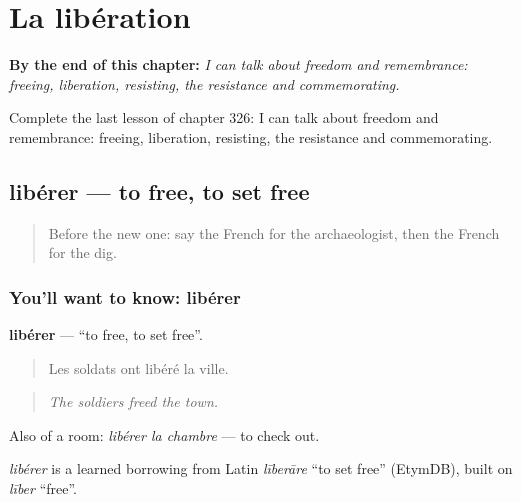 
\chapter{La libération}
\label{ch:fr-la-liberation}

\begin{chapteropening}
\textbf{By the end of this chapter:} \emph{I can talk about freedom and remembrance: freeing, liberation, resisting, the resistance and commemorating.}

Complete the last lesson of chapter 326: I can talk about freedom and remembrance: freeing, liberation, resisting, the resistance and commemorating.
\end{chapteropening}

\section[libérer]{libérer — to free, to set free}

\label{lesson:FR-C326-liberer}



\begin{quote}
Before the new one: say the French for the archaeologist, then the French for the dig.
\end{quote}

\subsection*{You'll want to know: libérer}
\textbf{libérer} — \textquotedblleft{}to free, to set free\textquotedblright{}.

\begin{quote}
Les soldats ont libéré la ville.
\end{quote}

\begin{quote}
\emph{The soldiers freed the town.}
\end{quote}

Also of a room: \emph{libérer la chambre} — to check out.

\begin{cousinweb}
\emph{libérer} is a learned borrowing from Latin \emph{līberāre} \textquotedblleft{}to set free\textquotedblright{} (EtymDB), built on \emph{līber} \textquotedblleft{}free\textquotedblright{}.
\end{cousinweb}

